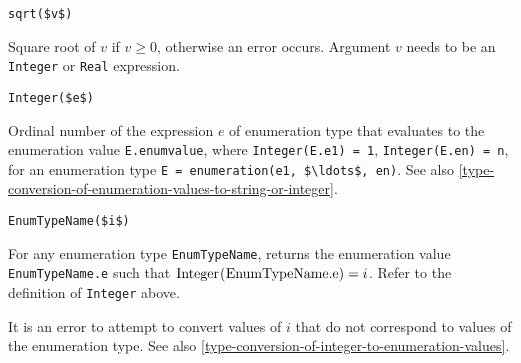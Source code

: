 \begin{functiondefinition}[sqrt]
\begin{synopsis}\begin{lstlisting}
sqrt($v$)
\end{lstlisting}\end{synopsis}
\begin{semantics}
Square root of $v$ if $v \geq 0$, otherwise an error occurs.  Argument $v$ needs to be an \lstinline!Integer! or \lstinline!Real! expression.
\end{semantics}
\end{functiondefinition}

\begin{operatordefinition*}[Integer]\label{modelica:integer-of-enumeration}
\begin{synopsis}\begin{lstlisting}
Integer($e$)
\end{lstlisting}\end{synopsis}
\begin{semantics}
Ordinal number of the expression $e$ of enumeration type that evaluates to the enumeration value \lstinline!E.enumvalue!, where \lstinline!Integer(E.e1) = 1!, \lstinline!Integer(E.en) = n!, for an enumeration type \lstinline!E = enumeration(e1, $\ldots$, en)!.
See also \cref{type-conversion-of-enumeration-values-to-string-or-integer}.
\end{semantics}
\end{operatordefinition*}

\begin{operatordefinition*}[<EnumTypeName>]\label{modelica:enumeration-of-integer}
\begin{synopsis}\begin{lstlisting}
EnumTypeName($i$)
\end{lstlisting}\end{synopsis}
\begin{semantics}
For any enumeration type \lstinline!EnumTypeName!, returns the enumeration value \lstinline!EnumTypeName.e! such that $\text{\lstinline!Integer(EnumTypeName.e)!} = i$.  Refer to the definition of \lstinline!Integer! above.

It is an error to attempt to convert values of $i$ that do not correspond to values of the enumeration type.  See also \cref{type-conversion-of-integer-to-enumeration-values}.
\end{semantics}
\end{operatordefinition*}

